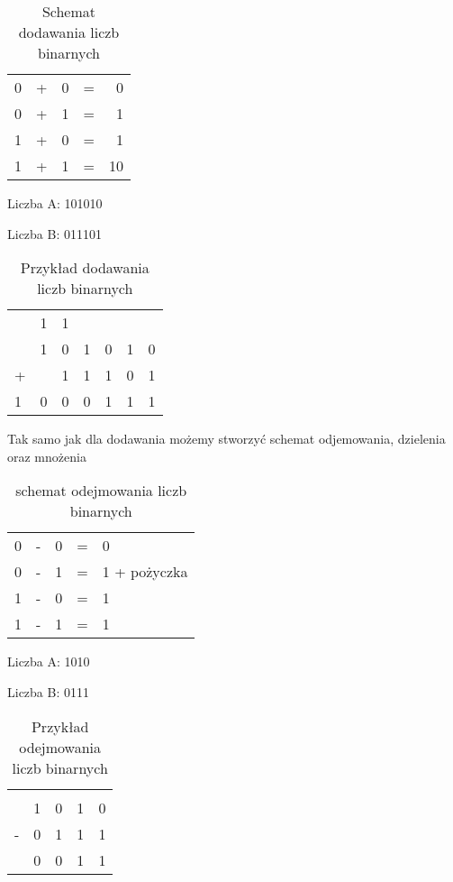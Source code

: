 \documentclass[12pt, a4paper, onside, polish]{article}				%
\begin{document}
\begin{table}[htb]
\caption{Schemat dodawania liczb binarnych}
\centering
\begin{tabular}{ccccr}
0 & + & 0 & = & 0  \\
0 & + & 1 & = & 1  \\
1 & + & 0 & = & 1  \\
1 & + & 1 & = & 10
\end{tabular}
\end{table}



Liczba A: 101010


Liczba B: 011101

\begin{table}[htb]
\caption{Przykład dodawania liczb binarnych}
\centering
\begin{tabular}{lllllll}
 & 1 & 1 &  &  &  &  \\
 & 1 & 0 & 1 & 0 & 1 & 0 \\
+ &  & 1 & 1 & 1 & 0 & 1 \\ \hline
1 & 0 & 0 & 0 & 1 & 1 & 1
\end{tabular}
\end{table}
\cleardoublepage

\iffalse
Tak samo jak dla dodawania możemy stworzyć schemat odjemowania, dzielenia oraz mnożenia 

\begin{table}[htb]
\caption{schemat odejmowania liczb binarnych}
\centering
\begin{tabular}{lllll}
0 & - & 0 & = & 0 \\
0 & - & 1 & = & 1 + pożyczka \\
1 & - & 0 & = & 1 \\
1 & - & 1 & = & 1
\end{tabular}
\end{table}


Liczba A: 1010

Liczba B: 0111

\begin{table}[htb]
\caption{Przykład odejmowania liczb binarnych}
\centering
\begin{tabular}{lllll}
 &  &  &  &  \\
 & 1 & 0 & 1 & 0 \\
- & 0 & 1 & 1 & 1 \\ \hline
 & 0 & 0 & 1 & 1
\end{tabular}
\end{table}

\cleardoublepage
\end{document}
